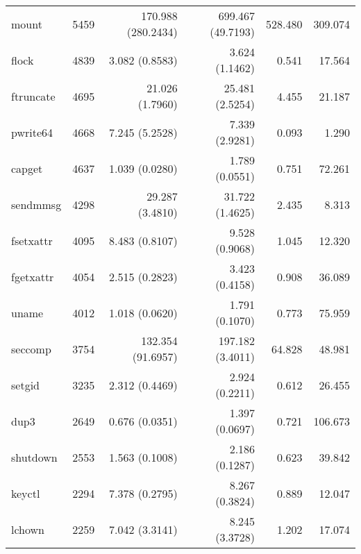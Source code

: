 \begin{longtable}{>{\ttfamily}lrrrrr}
                          mount &       5459 &          170.988 (280.2434) &         699.467 (49.7193) &         528.480 &      309.074 \\
                          flock &       4839 &              3.082 (0.8583) &            3.624 (1.1462) &           0.541 &       17.564 \\
                      ftruncate &       4695 &             21.026 (1.7960) &           25.481 (2.5254) &           4.455 &       21.187 \\
                       pwrite64 &       4668 &              7.245 (5.2528) &            7.339 (2.9281) &           0.093 &        1.290 \\
                         capget &       4637 &              1.039 (0.0280) &            1.789 (0.0551) &           0.751 &       72.261 \\
                       sendmmsg &       4298 &             29.287 (3.4810) &           31.722 (1.4625) &           2.435 &        8.313 \\
                      fsetxattr &       4095 &              8.483 (0.8107) &            9.528 (0.9068) &           1.045 &       12.320 \\
                      fgetxattr &       4054 &              2.515 (0.2823) &            3.423 (0.4158) &           0.908 &       36.089 \\
                          uname &       4012 &              1.018 (0.0620) &            1.791 (0.1070) &           0.773 &       75.959 \\
                        seccomp &       3754 &           132.354 (91.6957) &          197.182 (3.4011) &          64.828 &       48.981 \\
                         setgid &       3235 &              2.312 (0.4469) &            2.924 (0.2211) &           0.612 &       26.455 \\
                           dup3 &       2649 &              0.676 (0.0351) &            1.397 (0.0697) &           0.721 &      106.673 \\
                       shutdown &       2553 &              1.563 (0.1008) &            2.186 (0.1287) &           0.623 &       39.842 \\
                         keyctl &       2294 &              7.378 (0.2795) &            8.267 (0.3824) &           0.889 &       12.047 \\
                         lchown &       2259 &              7.042 (3.3141) &            8.245 (3.3728) &           1.202 &       17.074 \\

\end{longtable}
